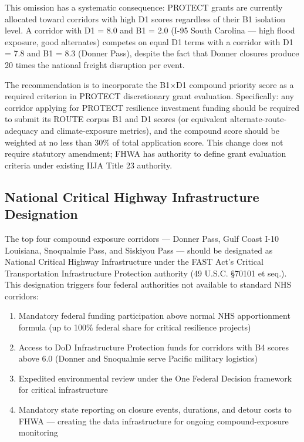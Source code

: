 This omission has a systematic consequence: PROTECT grants are currently allocated toward corridors with high D1 scores regardless of their B1 isolation level. A corridor with D1 = 8.0 and B1 = 2.0 (I-95 South Carolina --- high flood exposure, good alternates) competes on equal D1 terms with a corridor with D1 = 7.8 and B1 = 8.3 (Donner Pass), despite the fact that Donner closures produce 20 times the national freight disruption per event.

The recommendation is to incorporate the B1$\times$D1 compound priority score as a required criterion in PROTECT discretionary grant evaluation. Specifically: any corridor applying for PROTECT resilience investment funding should be required to submit its ROUTE corpus B1 and D1 scores (or equivalent alternate-route-adequacy and climate-exposure metrics), and the compound score should be weighted at no less than 30\% of total application score. This change does not require statutory amendment; FHWA has authority to define grant evaluation criteria under existing IIJA Title 23 authority.

\subsection{National Critical Highway Infrastructure Designation}

The top four compound exposure corridors --- Donner Pass, Gulf Coast I-10 Louisiana, Snoqualmie Pass, and Siskiyou Pass --- should be designated as National Critical Highway Infrastructure under the FAST Act's Critical Transportation Infrastructure Protection authority (49 U.S.C. \S 70101 et seq.). This designation triggers four federal authorities not available to standard NHS corridors:

\begin{enumerate}
  \item Mandatory federal funding participation above normal NHS apportionment formula (up to 100\% federal share for critical resilience projects)
  \item Access to DoD Infrastructure Protection funds for corridors with B4 scores above 6.0 (Donner and Snoqualmie serve Pacific military logistics)
  \item Expedited environmental review under the One Federal Decision framework for critical infrastructure
  \item Mandatory state reporting on closure events, durations, and detour costs to FHWA --- creating the data infrastructure for ongoing compound-exposure monitoring
\end{enumerate}

